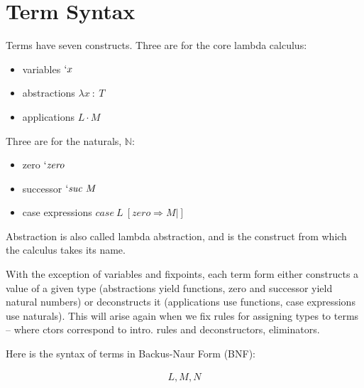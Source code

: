 \documentclass[runningheads]{llncs}
\begin{document}
\section{Term Syntax}

Terms have seven constructs. Three are for the core lambda calculus:
\begin{itemize}
\item variables $`x$ 
\item abstractions $λ x \ : \ T$ 
\item applications $L \cdot M$
\end{itemize}

Three are for the naturals, $\mathbb{N}$:
\begin{itemize}
\item zero $`\mathit{zero}$
\item successor $`\mathit{suc} \ M$ 
\item case expressions $\mathit{case} \ L \ [ \mathit{zero} \Rightarrow M | ]$ 
\end{itemize}

Abstraction is also called lambda abstraction, and is the construct from which 
the calculus takes its name.

With the exception of variables and fixpoints, each term form either constructs
a value of a given type (abstractions yield functions, zero and successor yield 
natural numbers) or deconstructs it (applications use functions, case 
expressions use naturals). This will arise again when we fix rules for assigning
types to terms -- where ctors correspond to intro. rules and deconstructors, 
eliminators.

Here is the syntax of terms in Backus-Naur Form (BNF):

\begin{align*}
L, M, N 
\end{align*}
\end{document}
